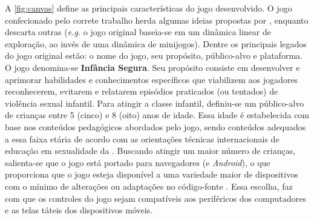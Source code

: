 
A \autoref{fig:canvas} define as principais características do jogo desenvolvido. O jogo confecionado pelo correte trabalho herda algumas ideias propostas por , enquanto descarta outras (\textit{e.g.} o jogo original baseia-se em um dinâmica linear de exploração, ao invés de uma dinâmica de minijogos). Dentre os principais legados do jogo original estão: o nome do jogo, seu propósito, público-alvo e plataforma. O jogo denomina-se \textbf{Infância Segura}. Seu propósito consiste em desenvolver e aprimorar habilidades e conhecimentos específicos que viabilizem aos jogadores reconhecerem, evitarem e relatarem episódios praticados (ou tentados) de violência sexual infantil. Para atingir a classe infantil, definiu-se um público-alvo de crianças entre 5 (cinco) e 8 (oito) anos de idade. Essa idade é estabelecida com base nos conteúdos pedagógicos abordados pelo jogo, sendo conteúdos adequados a essa faixa etária de acordo com as orientações técnicas internacionais de educação em sexualidade da . Buscando atingir um maior número de crianças, salienta-se que o jogo está portado para navegadores (e \textit{Android}), o que proporciona que o jogo esteja disponível a uma variedade maior de dispositivos com o mínimo de alterações ou adaptações no código-fonte \cite{carrara2018criancca}. Essa escolha, faz com que os controles do jogo sejam compatíveis aos periféricos dos computadores e as telas táteis dos dispositivos móveis.

